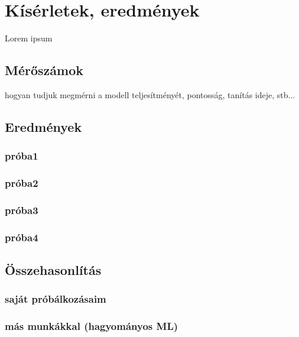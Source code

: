 \chapter{Kísérletek, eredmények} 
\label{ch:results}

Lorem ipsum

\section{Mérőszámok}

hogyan tudjuk megmérni a modell teljesítményét, pontosság, tanítás ideje, stb...

\section{Eredmények}

\subsection{próba1}

\subsection{próba2}

\subsection{próba3}

\subsection{próba4}


\section{Összehasonlítás}

\subsection{saját próbálkozásaim} 

\subsection{más munkákkal (hagyományos ML) }